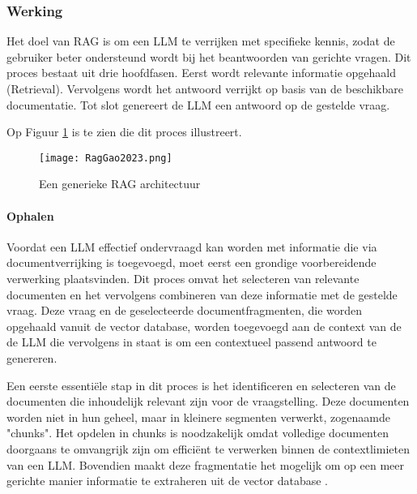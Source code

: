     \subsubsection{Werking}
    
    Het doel van RAG is om een LLM te verrijken met specifieke kennis, zodat de gebruiker beter ondersteund wordt bij het beantwoorden van gerichte vragen. Dit proces bestaat uit drie hoofdfasen. Eerst wordt relevante informatie opgehaald (Retrieval). Vervolgens wordt het antwoord verrijkt op basis van de beschikbare documentatie. Tot slot genereert de LLM een antwoord op de gestelde vraag.
    
    Op Figuur \ref{fig:Rag process} is te zien die dit proces illustreert.
    
    \begin{figure}[H]
        \centering
        \texttt{[image: RagGao2023.png]}
        \caption{Een generieke RAG architectuur \autocite{gao2024retrievalaugmentedgenerationlargelanguage}}
        \label{fig:Rag process}
    \end{figure}
    
    \paragraph{Ophalen}
     
    Voordat een LLM effectief ondervraagd kan worden met informatie die via documentverrijking is toegevoegd, moet eerst een grondige voorbereidende verwerking plaatsvinden. Dit proces omvat het selecteren van relevante documenten en het vervolgens combineren van deze informatie met de gestelde vraag. Deze vraag en de geselecteerde documentfragmenten, die worden opgehaald vanuit de vector database, worden toegevoegd aan de context van de de LLM die vervolgens in staat is om een contextueel passend antwoord te genereren.
    
    Een eerste essentiële stap in dit proces is het identificeren en selecteren van de documenten die inhoudelijk relevant zijn voor de vraagstelling. Deze documenten worden niet in hun geheel, maar in kleinere segmenten verwerkt, zogenaamde "chunks". Het opdelen in chunks is noodzakelijk omdat volledige documenten doorgaans te omvangrijk zijn om efficiënt te verwerken binnen de contextlimieten van een LLM. Bovendien maakt deze fragmentatie het mogelijk om op een meer gerichte manier informatie te extraheren uit de vector database \autocite{wu2025retrievalaugmentedgenerationnaturallanguage}.
    
